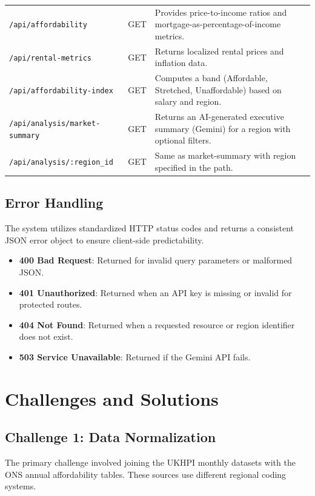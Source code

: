 \documentclass[11pt,a4paper]{article}
\begin{document}
\begin{center}
\begin{tabularx}{\textwidth}{@{}llX@{}}
\texttt{/api/affordability} & GET & Provides price-to-income ratios and mortgage-as-percentage-of-income metrics. \\
\texttt{/api/rental-metrics} & GET & Returns localized rental prices and inflation data. \\
\texttt{/api/affordability-index} & GET & Computes a band (Affordable, Stretched, Unaffordable) based on salary and region. \\
\texttt{/api/analysis/market-summary} & GET & Returns an AI-generated executive summary (Gemini) for a region with optional filters. \\
\texttt{/api/analysis/:region\_id} & GET & Same as market-summary with region specified in the path. \\
\bottomrule
\end{tabularx}
\end{center}

\subsection{Error Handling}

The system utilizes standardized HTTP status codes and returns a consistent JSON error object to ensure client-side predictability.

\begin{itemize}[nosep]
  \item \textbf{400 Bad Request}: Returned for invalid query parameters or malformed JSON.
  \item \textbf{401 Unauthorized}: Returned when an API key is missing or invalid for protected routes.
  \item \textbf{404 Not Found}: Returned when a requested resource or region identifier does not exist.
  \item \textbf{503 Service Unavailable}: Returned if the Gemini API fails.
\end{itemize}

\section{Challenges and Solutions}

\subsection{Challenge 1: Data Normalization}

The primary challenge involved joining the UKHPI monthly datasets with the ONS annual affordability tables. These sources use different regional coding systems.
\end{document}

